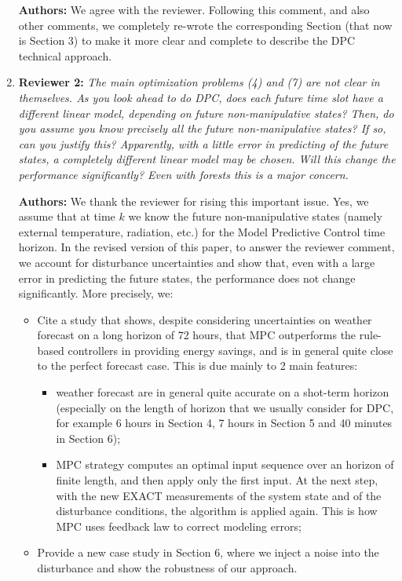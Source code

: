 \documentclass{article}
\begin{document}
\begin{enumerate}
\textbf{Authors:}  We agree with the reviewer. Following this comment, and also other comments, we completely re-wrote the corresponding Section (that now is Section 3) to make it more clear and complete to describe the DPC technical approach.



\item \textbf{Reviewer 2:} \textit{The main optimization problems (4) and (7) are not clear in themselves. As you look ahead to do DPC, does each future time slot have a different linear model, depending on future non-manipulative states? Then, do you assume you know precisely all the future non-manipulative states? If so, can you justify this? Apparently, with a little error in predicting of the future states, a completely different linear model may be chosen. Will this change the performance significantly? Even with forests this is a major concern.}



\textbf{Authors:} We thank the reviewer for rising this important issue. Yes, we assume that at time $k$ we know the future non-manipulative states (namely external temperature, radiation, etc.) for the Model Predictive Control time horizon. In the revised version of this paper, to answer the reviewer comment, we account for disturbance uncertainties and show that, even with a large error in predicting the future states, the performance does not change significantly. More precisely, we:
	\begin{itemize}
		\item Cite a study that shows, despite considering uncertainties on weather forecast on a long horizon of 72 hours, that MPC outperforms the rule-based controllers in providing energy savings, and is in general quite close to the perfect forecast case. This is due mainly to 2 main features:
		\begin{itemize}
			\item weather forecast are in general quite accurate on a shot-term horizon (especially on the length of horizon that we usually consider for DPC, for example 6 hours in Section 4, 7 hours in Section 5 and 40 minutes in Section 6);
			\item MPC strategy computes an optimal input sequence over an horizon of finite length, and then apply only the first input. At the next step, with the new EXACT measurements of the system state and of the disturbance conditions, the algorithm is applied again. This is how MPC uses feedback law to correct modeling errors;
	\end{itemize}
		\item Provide a new case study in Section 6, where we inject a noise into the disturbance and show the robustness of our approach.
	\end{itemize}




\end{enumerate}
\end{document}
